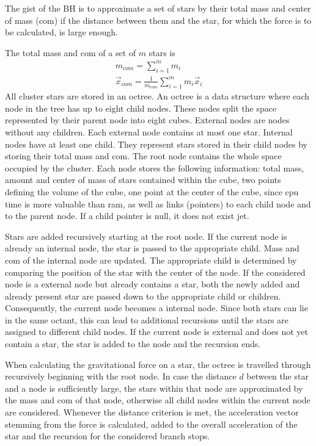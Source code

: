 \documentclass[letterpaper,10pt,english]{sphinxmanual}
\begin{document}
\sphinxAtStartPar
The gist of the BH is to approximate a set of stars by their total mass and center of mass (com) if the distance between them
and the star, for which the force is to be calculated, is large enough.

\sphinxAtStartPar
The total mass and com of a set of \(m\) stars is
\begin{equation*}
\begin{split}m_{com} = \sum_{i=1}^mm_i \\
\vec{x}_{com} = \frac{1}{m_{com}}\sum_{i=1}^mm_i\vec{x}_i\end{split}
\end{equation*}
\sphinxAtStartPar
All cluster stars are stored in an octree.
An octree is a data structure where each node in the tree has up to eight child nodes.
These nodes split the space represented by their parent node into eight cubes.
External nodes are nodes without any children. Each external node contains at most one star.
Internal nodes have at least one child. They represent stars stored in their child nodes by storing their total mass and com.
The root node contains the whole space occupied by the cluster. Each node stores the following information: total mass, amount and center of mass of stars
contained within the cube, two points defining the volume of the cube, one point at the center of the cube, since cpu time is more valuable than ram,
as well as links (pointers) to each child node and to the parent node.
If a child pointer is null, it does not exist jet.

\sphinxAtStartPar
Stars are added recursively starting at the root node. If the current node is already an internal node, the star is passed
to the appropriate child. Mass and com of the internal node are updated.
The appropriate child is determined by comparing the position of the star with the center of the node.
If the considered node is a external node but already contains a star,
both the newly added and already present star are passed down to the appropriate child or children.
Consequently, the current node becomes a internal node.
Since both stars can lie in the same octant, this can lead to additional recursions until the stars are assigned to different child nodes.
If the current node is external and does not yet contain a star, the star is added to the node and the recursion ends.

\sphinxAtStartPar
When calculating the gravitational force on a star, the octree is travelled through recursively beginning with the root node.
In case the distance \(d\) between the star and a node is sufficiently large, the stars within that node are approximated by the mass and com of that node,
otherwise all child nodes within the current node are considered. Whenever the distance criterion is met,
the acceleration vector stemming from the force is calculated, added to the overall acceleration of the star and the recursion for the considered branch stops.
\end{document}
